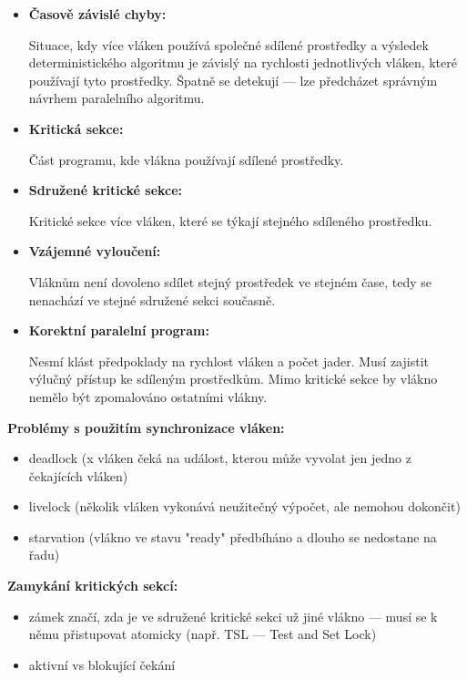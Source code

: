 \begin{itemize}
	\item \textbf{Časově závislé chyby:}
	
	Situace, kdy více vláken používá společné sdílené prostředky a výsledek deterministického algoritmu je závislý na rychlosti jednotlivých vláken, které používají tyto prostředky. Špatně se detekují --- lze předcházet správným návrhem paralelního algoritmu.
	
	\item \textbf{Kritická sekce:}
	
	Část programu, kde vlákna používají sdílené prostředky.
	
	\item \textbf{Sdružené kritické sekce:}
	
	Kritické sekce více vláken, které se týkají stejného sdíleného prostředku.
	
	\item \textbf{Vzájemné vyloučení:}
	
	Vláknům není dovoleno sdílet stejný prostředek ve stejném čase, tedy se nenachází ve stejné sdružené sekci současně.
	
	\item \textbf{Korektní paralelní program:}
	
	Nesmí klást předpoklady na rychlost vláken a počet jader. Musí zajistit výlučný přístup ke sdíleným prostředkům. Mimo kritické sekce by vlákno nemělo být zpomalováno ostatními vlákny.
\end{itemize}

\textbf{Problémy s použitím synchronizace vláken:}
\begin{itemize}
	\item deadlock (x vláken čeká na událost, kterou může vyvolat jen jedno z čekajících vláken)
	\item livelock (několik vláken vykonává neužitečný výpočet, ale nemohou dokončit)
	\item starvation (vlákno ve stavu "ready" předbíháno a dlouho se nedostane na řadu)
\end{itemize}

\textbf{Zamykání kritických sekcí:}
\begin{itemize}
	\item zámek značí, zda je ve sdružené kritické sekci už jiné vlákno --- musí se k němu přistupovat atomicky (např. TSL --- Test and Set Lock)
	\item aktivní vs blokující čekání
\end{itemize}

